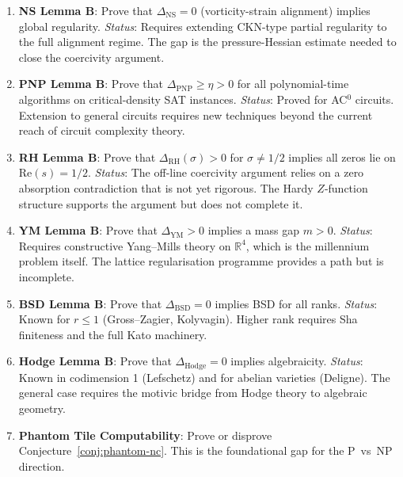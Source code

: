 \documentclass[12pt, openany]{book}
\theoremstyle{remark}
\begin{document}
\begin{enumerate}
  \item \textbf{NS Lemma B}: Prove that $\Delta_{\mathrm{NS}} = 0$ (vorticity-strain
        alignment) implies global regularity. \emph{Status}: Requires extending
        CKN-type partial regularity to the full alignment regime. The gap is
        the pressure-Hessian estimate needed to close the coercivity argument.

  \item \textbf{PNP Lemma B}: Prove that $\Delta_{\mathrm{PNP}} \geq \eta > 0$
        for all polynomial-time algorithms on critical-density SAT instances.
        \emph{Status}: Proved for AC$^0$ circuits. Extension to general circuits
        requires new techniques beyond the current reach of circuit complexity theory.

  \item \textbf{RH Lemma B}: Prove that $\Delta_{\mathrm{RH}}(\sigma) > 0$ for
        $\sigma \neq 1/2$ implies all zeros lie on $\mathrm{Re}(s) = 1/2$.
        \emph{Status}: The off-line coercivity argument relies on a zero
        absorption contradiction that is not yet rigorous. The Hardy $Z$-function
        structure supports the argument but does not complete it.

  \item \textbf{YM Lemma B}: Prove that $\Delta_{\mathrm{YM}} > 0$ implies
        a mass gap $m > 0$. \emph{Status}: Requires constructive Yang--Mills
        theory on $\mathbb{R}^4$, which is the millennium problem itself. The
        lattice regularisation programme provides a path but is incomplete.

  \item \textbf{BSD Lemma B}: Prove that $\Delta_{\mathrm{BSD}} = 0$ implies
        BSD for all ranks. \emph{Status}: Known for $r \leq 1$ (Gross--Zagier,
        Kolyvagin). Higher rank requires Sha finiteness and the full Kato
        machinery.

  \item \textbf{Hodge Lemma B}: Prove that $\Delta_{\mathrm{Hodge}} = 0$
        implies algebraicity. \emph{Status}: Known in codimension 1 (Lefschetz)
        and for abelian varieties (Deligne). The general case requires the
        motivic bridge from Hodge theory to algebraic geometry.

  \item \textbf{Phantom Tile Computability}: Prove or disprove
        Conjecture~\ref{conj:phantom-nc}. This is the foundational gap
        for the P~vs~NP direction.


\end{enumerate}
\end{document}
